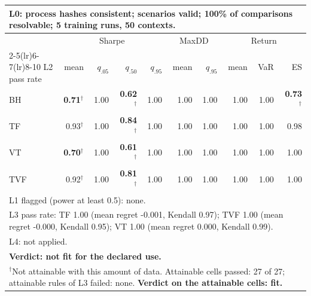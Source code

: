 \begin{tabular}{lrrrrrrrrr}
\toprule
\multicolumn{10}{p{13.5cm}}{L0: process hashes consistent; scenarios valid; 100\% of comparisons resolvable; 5 training runs, 50 contexts.} \\
\midrule
 & \multicolumn{4}{c}{Sharpe} & \multicolumn{2}{c}{MaxDD} & \multicolumn{3}{c}{Return} \\
\cmidrule(lr){2-5}\cmidrule(lr){6-7}\cmidrule(lr){8-10}
L2 pass rate & mean & $q_{.05}$ & $q_{.50}$ & $q_{.95}$ & mean & $q_{.95}$ & mean & VaR & ES \\
\midrule
BH & \textbf{0.71}$^{\dagger}$ & 1.00 & \textbf{0.62}$^{\dagger}$ & 1.00 & 1.00 & 1.00 & 1.00 & 1.00 & \textbf{0.73}$^{\dagger}$ \\
TF & 0.93$^{\dagger}$ & 1.00 & \textbf{0.84}$^{\dagger}$ & 1.00 & 1.00 & 1.00 & 1.00 & 1.00 & 0.98 \\
VT & \textbf{0.70}$^{\dagger}$ & 1.00 & \textbf{0.61}$^{\dagger}$ & 1.00 & 1.00 & 1.00 & 1.00 & 1.00 & 1.00 \\
TVF & 0.92$^{\dagger}$ & 1.00 & \textbf{0.81}$^{\dagger}$ & 1.00 & 1.00 & 1.00 & 1.00 & 1.00 & 1.00 \\
\midrule
\multicolumn{10}{p{13.5cm}}{L1 flagged (power at least 0.5): none.} \\
\multicolumn{10}{p{13.5cm}}{L3 pass rate: TF 1.00 (mean regret -0.001, Kendall 0.97); TVF 1.00 (mean regret -0.000, Kendall 0.95); VT 1.00 (mean regret 0.000, Kendall 0.99).} \\
\multicolumn{10}{p{13.5cm}}{L4: not applied.} \\
\multicolumn{10}{p{13.5cm}}{\textbf{Verdict: not fit for the declared use.}} \\
\multicolumn{10}{p{13.5cm}}{$^{\dagger}$Not attainable with this amount of data. Attainable cells passed: 27 of 27; attainable rules of L3 failed: none. \textbf{Verdict on the attainable cells: fit.}} \\
\bottomrule
\end{tabular}
